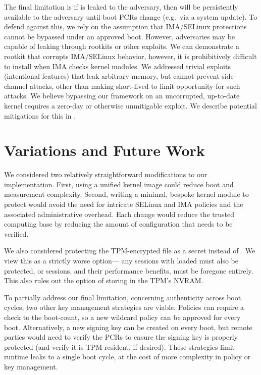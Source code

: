 \documentclass[12pt,letterpaper]{kuthesis}
\begin{document}
The final limitation is if \wcp is leaked to the adversary, then \pk will be persistently available to the adversary until boot PCRs change (e.g.\ via a system update).
To defend against this, we rely on the assumption that IMA/SELinux protections cannot be bypassed under an approved boot.
However, adversaries may be capable of leaking \wcp through rootkits or other exploits.
We can demonstrate a rootkit that corrupts IMA/SELinux behavior,
however, it is prohibitively difficult to install when IMA checks kernel modules.
We addressed trivial exploits (intentional features) that leak arbitrary memory,
but cannot prevent side-channel attacks, other than making
\tpmsign short-lived to limit opportunity for such attacks.
We believe bypassing our framework on an uncorrupted, up-to-date kernel requires a zero-day or otherwise unmitigable exploit.
We describe potential mitigations for this in .

\section{Variations and Future Work}\label{sec:variations}
We considered two relatively straightforward modifications to our implementation.
First, using a unified kernel image could reduce boot and measurement complexity.
Second, writing a minimal, bespoke kernel module to protect \wcp would avoid the need for intricate SELinux and IMA policies and the associated administrative overhead.
Each change would reduce the trusted computing base by reducing the amount of configuration that needs to be verified.

We also considered protecting the TPM-encrypted \pk file as a secret instead of \wcp.
We view this as a strictly worse option---%
any sessions with \pk loaded must also be protected, or sessions, and their performance benefits, must be foregone entirely.
This also rules out the option of storing \pk in the TPM's NVRAM.

To partially address our final limitation, concerning authenticity across boot cycles, two other key management strategies are viable.
Policies can require a check to the boot-count, so a new wildcard policy can be approved for every boot.
Alternatively, a new signing key can be created on every boot, but remote parties would need to verify the PCRs to ensure the signing key is properly protected
(and verify it is TPM-resident, if desired).
These strategies limit runtime leaks to a single boot cycle, at the cost of more complexity in policy or key management.
\end{document}
